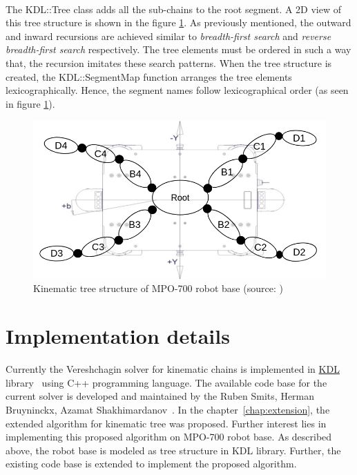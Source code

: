 \paragraph{}The KDL::Tree class adds all the sub-chains to the root segment. A 2D view of this tree structure is shown in the figure \ref{fig:planar-tree}. As previously mentioned, the outward and inward recursions are achieved similar to \textit{breadth-first search} and \textit{reverse breadth-first search} respectively. The tree elements must be ordered in such a way that, the recursion imitates these search patterns. When the tree structure is created, the KDL::SegmentMap function arranges the tree elements lexicographically. Hence, the segment names follow lexicographical order (as seen in figure \ref{fig:planar-tree}).  

\begin{figure}[h!]
	\begin{center}
		\includegraphics[scale=0.45]{images/kinematic-tree-MPO-700}
	\end{center}	
	\caption{Kinematic tree structure of MPO-700 robot base (source: \cite{MPO700})}
	\label{fig:planar-tree}
\end{figure}

\newpage
\section{Implementation details}
Currently the Vereshchagin solver for kinematic chains is implemented in \hyperref[kdl]{KDL} library~\cite{KDLopensource} using C++ programming language. The available code base for the current solver is developed and maintained by the Ruben Smits, Herman Bruyninckx, Azamat Shakhimardanov~\cite{KDLopensource}. In the chapter~\ref{chap:extension}, the extended algorithm for kinematic tree was proposed.  Further interest lies in implementing this proposed algorithm on MPO-700 robot base. As described above, the robot base is modeled as tree structure in KDL library. Further, the existing code base is extended to implement the proposed algorithm. 

